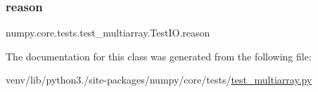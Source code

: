 \subsubsection{\texorpdfstring{reason}{reason}}
{\footnotesize\ttfamily numpy.\+core.\+tests.\+test\+\_\+multiarray.\+Test\+I\+O.\+reason\hspace{0.3cm}{\ttfamily [static]}}



The documentation for this class was generated from the following file\+:\begin{DoxyCompactItemize}
\item 
venv/lib/python3./site-\/packages/numpy/core/tests/\hyperlink{core_2tests_2test__multiarray_8py}{test\+\_\+multiarray.\+py}\end{DoxyCompactItemize}
